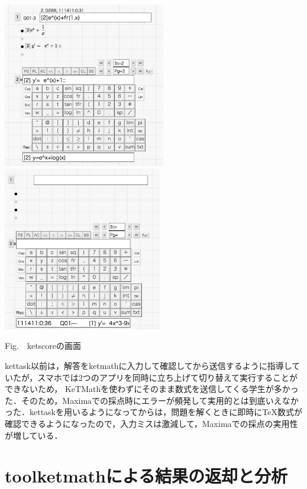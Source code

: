 \documentclass[a4j,12pt]{ujarticle}
\begin{document}
\begin{center}
\includegraphics[bb=0.00 0.00 720.00 730.00,height=72mm]{fig/ketscore1bw.pdf}
\hspace{5mm}%
\includegraphics[bb=0.00 0.00 691.00 715.00,height=72mm]{fig/ketscore3bw.pdf}

\addtocounter{figure}{1}Fig.\thefigure\ \ ketscoreの画面\vspace{-1mm}
\end{center}

kettask以前は，解答をketmathに入力して確認してから送信するように指導していたが，スマホでは2つのアプリを同時に立ち上げて切り替えて実行することができないため，
KeTMathを使わずにそのまま数式を送信してくる学生が多かった．そのため，Maximaでの採点時にエラーが頻発して実用的とは到底いえなかった．kettaskを用いるようになってからは，問題を解くときに即時に\TeX 数式が確認できるようになったので，入力ミスは激減して，Maximaでの採点の実用性が増している．

\section{toolketmathによる結果の返却と分析}
\end{document}
